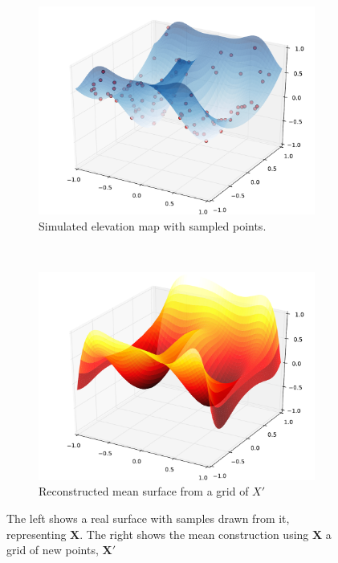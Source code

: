 \documentclass{article} %
\begin{document}
\begin{figure}
        \centering
        \begin{subfigure}[b]{0.5\textwidth}
                \centering
                \includegraphics[width=\textwidth]{2DGaussianProcess1.pdf}
                \caption{Simulated elevation map with sampled points.}
                \label{fig:elevation}
        \end{subfigure}%
        ~ %
        \begin{subfigure}[b]{0.5\textwidth}
                \centering
                \includegraphics[width=\textwidth]{2DGaussianProcess2.pdf}
                \caption{Reconstructed mean surface from a grid of $X'$}
                \label{fig:mean}
        \end{subfigure}
        \caption{The left shows a real surface with samples drawn from it, representing $\mathbf{X}$. The right shows the mean construction using $\mathbf{X}$ a grid of new points, $\mathbf{X'}$}\label{fig:GP}
\end{figure}
\end{document}
